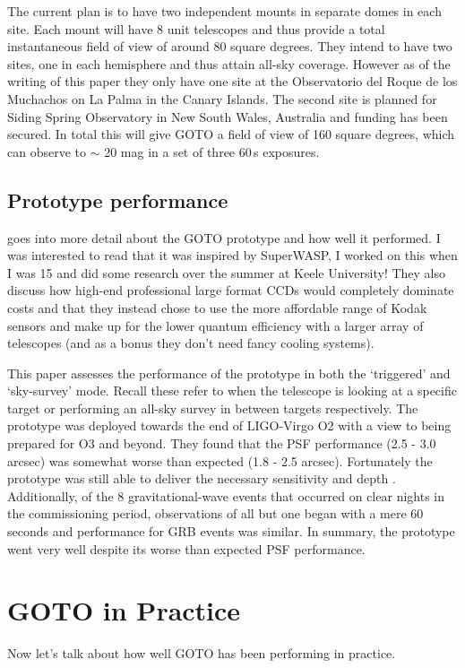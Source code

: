 \documentclass[twocolumn]{aastex631}
\begin{document}
The current plan is to have two independent mounts in separate domes in each site. Each mount will have 8 unit telescopes and thus provide a total instantaneous field of view of around 80 square degrees. They intend to have two sites, one in each hemisphere and thus attain all-sky coverage. However as of the writing of this paper they only have one site at the Observatorio del Roque de los Muchachos on La Palma in the Canary Islands. The second site is planned for Siding Spring Observatory in New South Wales, Australia and funding has been secured. In total this will give GOTO a field of view of 160 square degrees, which can observe to $\sim$ 20 mag in a set of three 60\,s exposures.

\subsection{Prototype performance}
\citet{Steeghs+2022} goes into more detail about the GOTO prototype and how well it performed. I was interested to read that it was inspired by SuperWASP, I worked on this when I was 15 and did some research over the summer at Keele University! They also discuss how high-end professional large format CCDs would completely dominate costs and that they instead chose to use the more affordable range of Kodak sensors and make up for the lower quantum efficiency with a larger array of telescopes (and as a bonus they don't need fancy cooling systems).

This paper assesses the performance of the prototype in both the `triggered' and `sky-survey' mode. Recall these refer to when the telescope is looking at a specific target or performing an all-sky survey in between targets respectively. The prototype was deployed towards the end of LIGO-Virgo O2 with a view to being prepared for O3 and beyond. They found that the PSF performance (2.5 - 3.0 arcsec) was somewhat worse than expected (1.8 - 2.5 arcsec). Fortunately the prototype was still able to deliver the necessary sensitivity and depth \citep[see][Fig.~9]{Steeghs+2022}. Additionally, of the 8 gravitational-wave events that occurred on clear nights in the commissioning period, observations of all but one began with a mere 60 seconds and performance for GRB events was similar. In summary, the prototype went very well despite its worse than expected PSF performance.

\section{GOTO in Practice}
Now let's talk about how well GOTO has been performing in practice.
\end{document}
